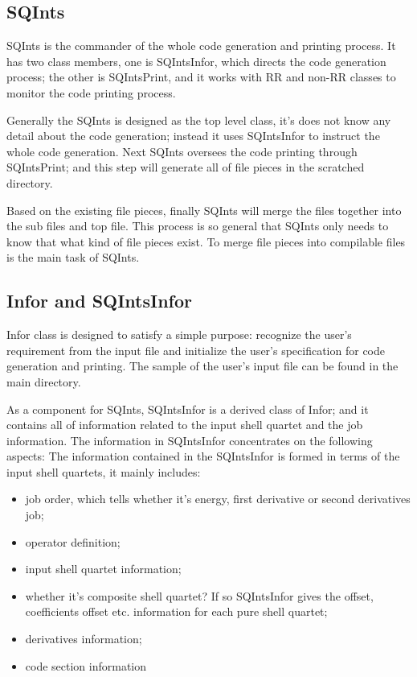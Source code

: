 \subsection{SQInts}
\label{sqints}

SQInts is the commander of the whole code generation and printing process. It has two class 
members, one is SQIntsInfor, which directs the code generation process; the other is 
SQIntsPrint, and it works with RR and non-RR classes to monitor the code printing process.

Generally the SQInts is designed as the top level class, it's does not know any detail about 
the code generation; instead it uses SQIntsInfor to instruct the whole code generation. Next
SQInts oversees the code printing through SQIntsPrint; and this step will generate all of 
file pieces in the scratched directory.

Based on the existing file pieces, finally SQInts will merge the files together into the 
sub files and top file. This process is so general that SQInts only needs to know that 
what kind of file pieces exist. To merge file pieces into compilable files is the main
task of SQInts.

\subsection{Infor and SQIntsInfor}
\label{infor_sqintsinfor}

Infor class is designed to satisfy a simple purpose: recognize the user's requirement from the 
input file and initialize the user's specification for code generation and printing. The sample
of the user's input file can be found in the main directory.

As a component for SQInts, SQIntsInfor is a derived class of Infor; and it contains all of information
related to the input shell quartet and the job information. The information in SQIntsInfor concentrates
on the following aspects:
The information contained in the SQIntsInfor is formed in terms of the input
shell quartets, it mainly includes:
\begin{itemize}
 \item job order, which tells whether it's energy, first derivative or second derivatives job;
 \item operator definition;
 \item input shell quartet information;
 \item whether it's composite shell quartet? If so SQIntsInfor gives the offset, coefficients offset 
 etc. information for each pure shell quartet;
 \item derivatives information;
 \item code section information
\end{itemize}


